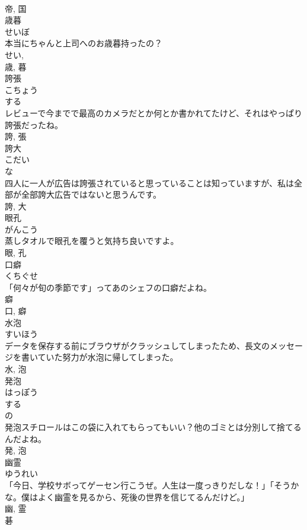 \documentclass[8pt]{extreport}
\begin{document}
\begin{CJK}{UTF8}{min}
\\	帝, 国	
\\	歳暮	
\\	せいぼ	
\\	本当にちゃんと上司へのお歳暮持ったの？	
\\	せい, 
\\	歳, 暮	
\\	誇張	
\\	こちょう	
\\	する 
\\	レビューで今までで最高のカメラだとか何とか書かれてたけど、それはやっぱり誇張だったね。	
\\	誇, 張	
\\	誇大	
\\	こだい	
\\	な 
\\	四人に一人が広告は誇張されていると思っていることは知っていますが、私は全部が全部誇大広告ではないと思うんです。	
\\	誇, 大	
\\	眼孔	
\\	がんこう	
\\	蒸しタオルで眼孔を覆うと気持ち良いですよ。	
\\	眼, 孔	
\\	口癖	
\\	くちぐせ	
\\	「何々が旬の季節です」ってあのシェフの口癖だよね。	
\\	癖 
\\	口, 癖	
\\	水泡	
\\	すいほう	
\\	データを保存する前にブラウザがクラッシュしてしまったため、長文のメッセージを書いていた努力が水泡に帰してしまった。	
\\	水, 泡	
\\	発泡	
\\	はっぽう	
\\	する 
\\	の 
\\	発泡スチロールはこの袋に入れてもらってもいい？他のゴミとは分別して捨てるんだよね。	
\\	発, 泡	
\\	幽霊	
\\	ゆうれい	
\\	「今日、学校サボってゲーセン行こうぜ。人生は一度っきりだしな！」「そうかな。僕はよく幽霊を見るから、死後の世界を信じてるんだけど。」	
\\	幽, 霊	
\\	碁	

\end{CJK}
\end{document}
